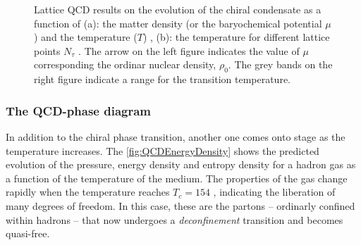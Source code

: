 \begin{figure}[h]
	\caption{Lattice QCD results on the evolution of the chiral condensate as a function of (a): the matter density (or the baryochemical potential $\mu$) and the temperature ($T$) \cite{muroyaLatticeQCDFinite2003}, (b): the temperature for different lattice points $N_{\tau}$ \cite{weiseChiralSymmetryStrongly2010}. The arrow on the left figure indicates the value of $\mu$ corresponding the ordinar nuclear density, $\rho_0$. The grey bands on the right figure indicate a range for the transition temperature.}
	\label{fig:ChiralSymmetryBreaking}
\end{figure}

\subsubsection{The QCD-phase diagram}
\label{subsubsec:QCDphasediagram}

In addition to the chiral phase transition, another one comes onto stage as the temperature increases. The \fig\ref{fig:QCDEnergyDensity} shows the predicted evolution of the pressure, energy density and entropy density for a hadron gas as a function of the temperature of the medium. The properties of the gas change rapidly when the temperature reaches $T_{c} = 154$ \mev, indicating the liberation of many degrees of freedom. In this case, these are the partons -- ordinarly confined within hadrons -- that now undergoes a \textit{deconfinement} transition and becomes quasi-free. 


